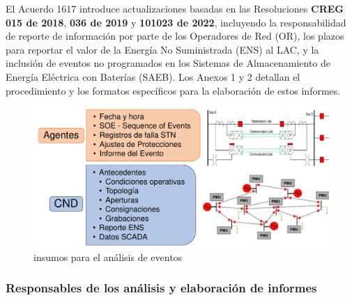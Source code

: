 \documentclass[a5paper]{book}%
\begin{document}
\vspace{0.5cm}

El Acuerdo 1617 introduce actualizaciones basadas en las Resoluciones \textbf{CREG 015 de 2018}, \textbf{036 de 2019} y \textbf{101023 de 2022}, incluyendo la responsabilidad de reporte de información por parte de los Operadores de Red (OR), los plazos para reportar el valor de la Energía No Suministrada (ENS) al LAC, y la inclusión de eventos no programados en los Sistemas de Almacenamiento de Energía Eléctrica con Baterías (SAEB). Los Anexos 1 y 2 detallan el procedimiento y los formatos específicos para la elaboración de estos informes.

\begin{figure}[H]
	\centering
	\caption{insumos para el análisis de eventos}
	\label{fig:insumoseventos}
	\includegraphics[width=0.8\linewidth]{insumos_eventos}
\end{figure}

\subsubsection{Responsables de los análisis y elaboración de informes}
\end{document}
